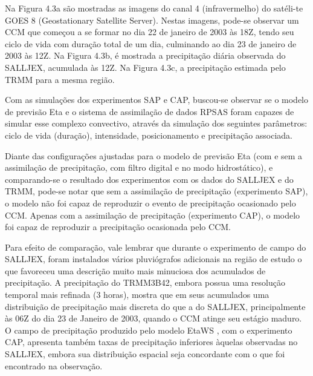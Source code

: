 Na Figura 4.3a são mostradas as imagens do canal 4 (infravermelho) do satéli-te GOES 8 (Geostationary Satellite Server). Nestas imagens, pode-se observar um CCM que começou a se formar no dia 22 de janeiro de 2003 às 18Z, tendo seu ciclo de vida com duração total de um dia, culminando ao dia 23 de janeiro de 2003 às 12Z. Na Figura 4.3b, é mostrada a precipitação diária observada do SALLJEX, acumulada às 12Z. Na Figura 4.3c, a precipitação estimada pelo TRMM para a mesma região.

Com as simulações dos experimentos SAP e CAP, buscou-se observar se o modelo de previsão Eta e o sistema de assimilação de dados RPSAS foram capazes de simular esse complexo convectivo, através da simulação dos seguintes parâmetros: ciclo de vida (duração), intensidade, posicionamento e precipitação associada.

Diante das configurações ajustadas para o modelo de previsão Eta (com e sem a assimilação de precipitação, com filtro digital e no modo hidrostático), e comparando-se o resultado dos experimentos com os dados do SALLJEX e do TRMM, pode-se notar que sem a assimilação de precipitação (experimento SAP), o modelo não foi capaz de reproduzir o evento de precipitação ocasionado pelo CCM. Apenas com a assimilação de precipitação (experimento CAP), o modelo foi capaz de reproduzir a precipitação ocasionada pelo CCM.

Para efeito de comparação, vale lembrar que durante o experimento de campo do SALLJEX, foram instalados vários pluviógrafos adicionais na região de estudo o que favoreceu uma descrição muito mais minuciosa dos acumulados de precipitação. A precipitação do TRMM3B42, embora possua uma resolução temporal mais refinada (3 horas), mostra que em seus acumulados uma distribuição de precipitação mais discreta do que a do SALLJEX, principalmente às 06Z do dia 23 de Janeiro de 2003, quando o CCM atinge seu estágio maduro. O campo de precipitação produzido pelo modelo EtaWS , com o experimento CAP, apresenta também taxas de precipitação inferiores àquelas observadas no SALLJEX, embora sua distribuição espacial seja concordante com o que foi encontrado na observação.

